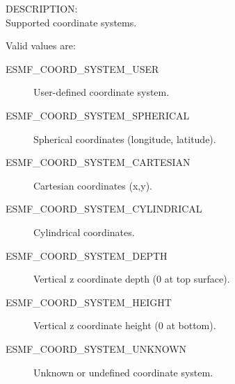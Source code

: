 {\sf DESCRIPTION:\\}
Supported coordinate systems.

Valid values are:
\begin{description}
   \item [ESMF\_COORD\_SYSTEM\_USER]
         User-defined coordinate system.

   \item [ESMF\_COORD\_SYSTEM\_SPHERICAL]
         Spherical coordinates (longitude, latitude).

   \item [ESMF\_COORD\_SYSTEM\_CARTESIAN]
         Cartesian coordinates (x,y).

   \item [ESMF\_COORD\_SYSTEM\_CYLINDRICAL] 
         Cylindrical coordinates.

   \item [ESMF\_COORD\_SYSTEM\_DEPTH]
         Vertical z coordinate depth (0 at top surface).

   \item [ESMF\_COORD\_SYSTEM\_HEIGHT]
         Vertical z coordinate height (0 at bottom).

   \item [ESMF\_COORD\_SYSTEM\_UNKNOWN]
         Unknown or undefined coordinate system.
\end{description}


